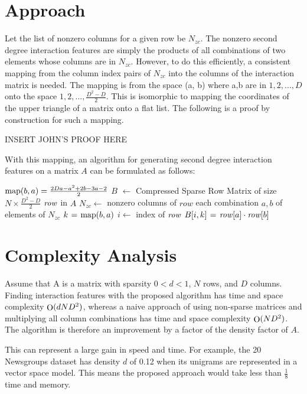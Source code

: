 \documentclass[11pt]{article}
\begin{document}
\section{Approach}
Let the list of nonzero columns for a given row be $N_{zc}$. The nonzero second degree 
interaction features are simply the products of all combinations of two elements whose 
columns are in $N_{zc}$. However, to do this efficiently, a consistent mapping from the column 
index pairs of $N_{zc}$ into the columns of the interaction matrix is needed. The mapping is 
from the space (a, b) where a,b are in $1,2,..., D$ onto the space $1,2,..., \frac{D^2-D}{2}$. This 
is isomorphic to mapping the coordinates of the upper triangle of a matrix onto a flat 
list. The following is a proof by construction for such a mapping.

INSERT JOHN'S PROOF HERE

With this mapping, an algorithm for generating second degree interaction features on a 
matrix $A$ can be formulated as follows:

\begin{codebox}
    \zi $\func{map}(b, a) = \frac{2Da-a^2+2b-3a-2}{2}$
    \zi $B$ $\gets$ Compressed Sparse Row Matrix of size $N \times \frac{D^2-D}{2}$
    \zi \For $\id{row}$ in $A$ \Repeat
    \zi     $N_{zc} \gets$ nonzero columns of $row$
    \zi     \For each combination $a, b$ of elements of $N_{zc}$ \Repeat
    \zi         $k \gets \func{map}(b, a)$
    \zi         $i \gets$ index of $\id{row}$
    \zi         $B[i, k] \gets \id{row}[a] \cdot \id{row}[b]$
            \End
       	\End
\end{codebox}

\section{Complexity Analysis}
Assume that A is a matrix with sparsity $0 < d < 1$, $N$ rows, and $D$ columns. Finding 
interaction features with the proposed algorithm has time and space complexity 
$\func{O}(d N D^2)$, 
whereas a naive approach of using non-sparse matrices and multiplying all column 
combinations has time and space complexity $\func{O}(N D^2)$. The algorithm is therefore an 
improvement by a factor of the density factor of $A$.

This can represent a large gain in speed and time. For example, the 20 Newsgroups dataset 
has density $d$ of 0.12 when its unigrams are represented in a vector space model. This 
means the proposed approach would take less than $\frac{1}{8}$ time and memory.
\end{document}
